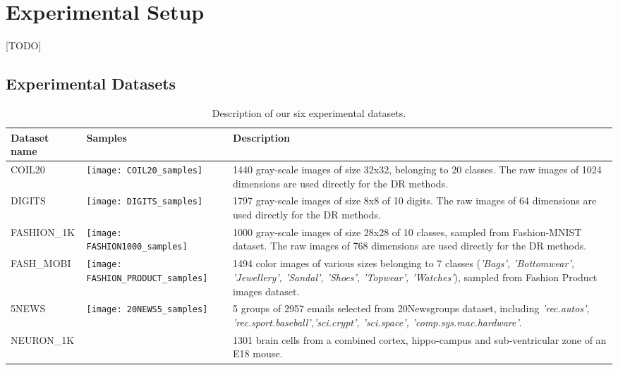 \section{Experimental Setup}\label{sec:xp:setup}

[TODO]

\subsection{Experimental Datasets}\label{sec:xp:data}

\begin{table*}[ht!]
\caption{Description of our six experimental datasets.}\label{tbl:dataset}
\begin{tabular}{m{2.2cm} m{5.4cm} m{7.4cm}}
\toprule
Dataset name & Samples & Description \\
\midrule

COIL20
    & \texttt{[image: COIL20\_samples]}
    & 1440 gray-scale images of size 32x32, belonging to 20 classes.
    The raw images of 1024 dimensions are used directly for the DR methods.\\

DIGITS
    & \texttt{[image: DIGITS\_samples]}
    & 1797 gray-scale images of size 8x8 of 10 digits.
    The raw images of 64 dimensions are used directly for the DR methods.\\

{FASHION\_1K}
    & \texttt{[image: FASHION1000\_samples]}
    & 1000 gray-scale images of size 28x28 of 10 classes, sampled from Fashion-MNIST dataset.
    The raw images of 768 dimensions are used directly for the DR methods.\\

{FASH\_MOBI}
    & \texttt{[image: FASHION\_PRODUCT\_samples]}
    & 1494 color images of various sizes belonging to 7 classes
    (\emph{'Bags', 'Bottomwear', 'Jewellery', 'Sandal', 'Shoes', 'Topwear', 'Watches'}),
    sampled from Fashion Product images dataset.\\

5NEWS
    & \texttt{[image: 20NEWS5\_samples]}
    & 5 groups of 2957 emails selected from 20Newsgroups dataset,
    including \emph{'rec.autos', 'rec.sport.baseball','sci.crypt', 'sci.space', 'comp.sys.mac.hardware'}. \\

{NEURON\_1K}
    &
    & 1301 brain cells from a combined cortex, hippo-campus and sub-ventricular zone of an E18 mouse. \\

\bottomrule
\end{tabular}
\end{table*}


